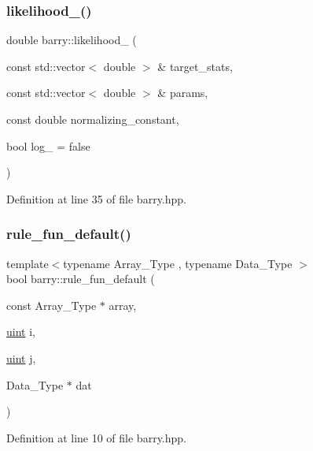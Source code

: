 \subsubsection{\texorpdfstring{likelihood\+\_\+()}{likelihood\_()}}
{\footnotesize\ttfamily double barry\+::likelihood\+\_\+ (\begin{DoxyParamCaption}\item[{const std\+::vector$<$ double $>$ \&}]{target\+\_\+stats,  }\item[{const std\+::vector$<$ double $>$ \&}]{params,  }\item[{const double}]{normalizing\+\_\+constant,  }\item[{bool}]{log\+\_\+ = {\ttfamily false} }\end{DoxyParamCaption})\hspace{0.3cm}{\ttfamily [inline]}}



Definition at line 35 of file barry.\+hpp.

\mbox{\label{namespacebarry_afb5a6f58fa7969d3027468e393eecd51}} 
\subsubsection{\texorpdfstring{rule\+\_\+fun\+\_\+default()}{rule\_fun\_default()}}
{\footnotesize\ttfamily template$<$typename Array\+\_\+\+Type , typename Data\+\_\+\+Type $>$ \\
bool barry\+::rule\+\_\+fun\+\_\+default (\begin{DoxyParamCaption}\item[{const Array\+\_\+\+Type $\ast$}]{array,  }\item[{\hyperlink{namespacebarry_a11dfc53ddb4672278319aa04f1e09a6c}{uint}}]{i,  }\item[{\hyperlink{namespacebarry_a11dfc53ddb4672278319aa04f1e09a6c}{uint}}]{j,  }\item[{Data\+\_\+\+Type $\ast$}]{dat }\end{DoxyParamCaption})}



Definition at line 10 of file barry.\+hpp.

\mbox{\label{namespacebarry_a2889c6210e2711e33c34ca9c8b5de7d9}} 
